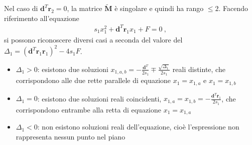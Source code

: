 \documentclass[letterpaper,10pt,italian]{jupyterBook}
\begin{document}
\sphinxAtStartPar
Nel caso di \(\mathbf{d}^T \mathbf{r}_2 = 0\), la matrice \(\widetilde{\mathbf{M}}\) è singolare e quindi ha rango \(\le 2\). Facendo riferimento all’equazione
\begin{equation*}
\begin{split}s_1 x_1^2 + \mathbf{d}^T \mathbf{r}_1 x_1 + F = 0 \ ,\end{split}
\end{equation*}
\sphinxAtStartPar
si possono riconoscere diversi casi a seconda del valore del  \(\Delta_1 = \left( \mathbf{d}^T \mathbf{r}_1 \mathbf{r}_1 \right)^2 - 4 s_1 F\).
\begin{itemize}
\item {} 
\sphinxAtStartPar
\(\Delta_1 > 0\): esistono due soluzioni \(x_{1,a,b} = - \frac{\mathbf{d}^T}{2 s_1} \mp \frac{\sqrt{\Delta_1}}{2 s_1}\) reali distinte, che corrispondono alle due rette parallele di equazione \(x_1 = x_{1,a}\) e \(x_1 = x_{1,b}\)

\item {} 
\sphinxAtStartPar
\(\Delta_1 = 0\): esistono due soluzioni reali coincidenti, \(x_{1,a} = x_{1,b} = - \frac{\mathbf{d}^T \mathbf{r}_1}{2 s_1}\), che corrispondono entrambe alla retta di equazione \(x_1 = x_{1,a}\)

\item {} 
\sphinxAtStartPar
\(\Delta_1 < 0\): non esistono soluzioni reali dell’equazione, cioè l’espressione non rappresenta nessun punto nel piano

\end{itemize}
\end{document}
